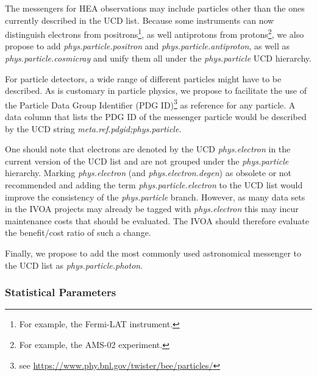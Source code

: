 \documentclass[11pt,a4paper]{ivoa}
\begin{document}
The messengers for \gls{HEA} observations may include particles other than the ones currently described in the UCD list.  Because some instruments can now distinguish electrons from positrons\footnote{For example, the Fermi-LAT instrument.}, as well antiprotons from protons\footnote{For example, the AMS-02 experiment.}, we also propose to add {\em phys.particle.positron\/} and {\em phys.particle.antiproton\/}, as well as {\em phys.particle.cosmicray\/} and unify them all under the {\em phys.particle\/} UCD hierarchy.

For particle detectors, a wide range of different particles might have to be described. As is customary in particle physics, we propose to facilitate the use of the Particle Data Group Identifier (PDG ID)\footnote{see \url{https://www.phy.bnl.gov/twister/bee/particles/}} as reference for any particle.  A data column that lists the PDG ID of the messenger particle would be described by the UCD string {\em meta.ref.pdgid;phys.particle\/}.

One should note that electrons are denoted by the UCD {\em phys.electron\/} in the current version of the UCD list \citep{2024ivoa.spec.1218C} and are not grouped under the {\em phys.particle\/} hierarchy.
Marking {\em phys.electron\/} (and {\em phys.electron.degen\/}) as obsolete or not recommended and adding the term  {\em phys.particle.electron\/} to the UCD list would improve the consistency of the {\em phys.particle\/} branch.
However, as many data sets in the IVOA projects may already be tagged with {\em phys.electron\/} this may incur maintenance costs that should be evaluated.
The IVOA should therefore evaluate the benefit/cost ratio of such a change.

Finally, we propose to add the most commonly used astronomical messenger to the UCD list as {\em phys.particle.photon\/}.

\subsubsection{Statistical Parameters}
\end{document}
